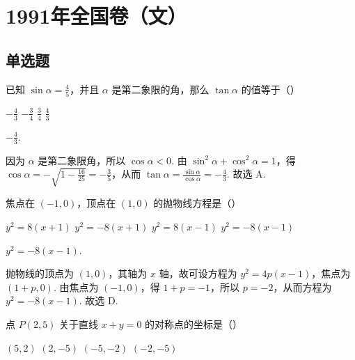\documentclass[UTF8,a4paper,oneside,11pt]{ctexbook}
\begin{document}
\mainmatter

\chapter{1991年全国卷（文）}
\section{单选题}

\begin{problem}
已知 \(\sin \alpha = \frac{4}{5}\)，并且 \(\alpha\) 是第二象限的角，那么 \(\tan \alpha\) 的值等于（\quad）

\choices
    {\(-\frac{4}{3}\)}
    {\(-\frac{3}{4}\)}
    {\(\frac{3}{4}\)}
    {\(\frac{4}{3}\)}
\end{problem}

\begin{answer}
\(-\frac{4}{3}\).
\end{answer}

\begin{solution}
因为 \(\alpha\) 是第二象限角，所以 \(\cos\alpha<0\). 由 \(\sin^2\alpha+\cos^2\alpha=1\)，得 \(\cos\alpha=-\sqrt{1-\frac{16}{25}}=-\frac{3}{5}\)，从而 \(\tan\alpha=\frac{\sin\alpha}{\cos\alpha}=-\frac{4}{3}\). 故选 A.
\end{solution}

\begin{problem}
焦点在 \((-1,0)\)，顶点在 \((1,0)\) 的抛物线方程是（\quad）

\choices
    {\(y^{2} = 8(x + 1)\)}
    {\(y^{2} = -8(x + 1)\)}
    {\(y^{2} = 8(x - 1)\)}
    {\(y^{2} = -8(x - 1)\)}
\end{problem}

\begin{answer}
\(y^{2}=-8(x-1)\).
\end{answer}

\begin{solution}
抛物线的顶点为 \((1,0)\)，其轴为 \(x\) 轴，故可设方程为 \(y^2=4p(x-1)\)，焦点为 \((1+p,0)\). 由焦点为 \((-1,0)\)，得 \(1+p=-1\)，所以 \(p=-2\)，从而方程为 \(y^2=-8(x-1)\). 故选 D.
\end{solution}

\begin{problem}
点 \(P(2,5)\) 关于直线 \(x + y = 0\) 的对称点的坐标是（\quad）

\choices
    {\((5,2)\)}
    {\((2,-5)\)}
    {\((-5,-2)\)}
    {\((-2,-5)\)}
\end{problem}
\end{document}
